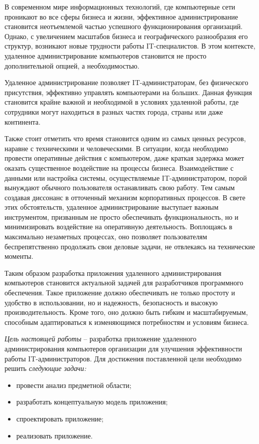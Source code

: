 \newsection
{}

В современном мире информационных технологий, где компьютерные сети проникают во все сферы бизнеса и жизни, эффективное администрирование становится неотъемлемой частью успешного функционирования организаций. Однако, с увеличением масштабов бизнеса и географического разнообразия его структур, возникают новые трудности работы IT-специалистов. В этом контексте, удаленное администрирование компьютеров становится не просто дополнительной опцией, а необходимостью.

Удаленное администрирование позволяет IT-администраторам, без физического присутствия, эффективно управлять компьютерами на больших. Данная функция становится крайне важной и необходимой в условиях удаленной работы, где сотрудники могут находиться в разных частях города, страны или даже континента.

Также стоит отметить что время становится одним из самых ценных ресурсов, наравне с техническими и человеческими. В ситуации, когда необходимо провести оперативные действия с компьютером, даже краткая задержка может оказать существенное воздействие на процессы бизнеса. Взаимодействие с данными или настройка системы, осуществляемые IT-администратором, порой вынуждают обычного пользователя останавливать свою работу. Тем самым создавая диссонанс в отточенный механизм корпоративных процессов. В свете этих обстоятельств, удаленное администрирование выступает важным инструментом, призванным не просто обеспечивать функциональность, но и минимизировать воздействие на оперативную деятельность. Воплощаясь в максимально незаметных процессах, оно позволяет пользователям беспрепятственно продолжать свои деловые задачи, не отвлекаясь на технические моменты.

Таким образом разработка приложения удаленного администрирования компьютеров становится актуальной задачей для разработчиков программного обеспечения. Такое приложение должно обеспечивать не только простоту и удобство в использовании, но и надежность, безопасность и высокую производительность. Кроме того, оно должно быть гибким и масштабируемым, способным адаптироваться к изменяющимся потребностям и условиям бизнеса.

\emph{Цель настоящей работы} – разработка приложение удаленного администрирования компьютеров организации для улучшения эффективности работы IT-администраторов. Для достижения поставленной цели необходимо решить \emph{следующие задачи:}
\begin{itemize}
\item провести анализ предметной области;
\item разработать концептуальную модель приложения;
\item спроектировать приложение;
\item реализовать приложение.
\end{itemize}

